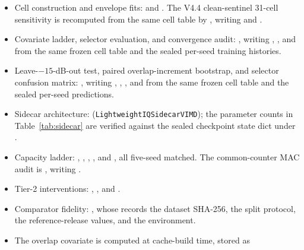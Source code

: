 \documentclass[letterpaper,onecolumn,11pt,journal]{IEEEtran}
\begin{document}
\begin{itemize}\setlength{\itemsep}{2pt}
  \item Cell construction and envelope fits:
   and
  .  The V4.4 clean-sentinel
  31-cell sensitivity is recomputed from the same cell table by
  , writing
   and
  .
  \item Covariate ladder, selector evaluation, and convergence audit:
  , writing
  , , and
   from the same frozen cell table and the
  sealed per-seed  training histories.
  \item Leave-$-15$-dB-out test, paired overlap-increment bootstrap, and
  selector confusion matrix:
  , writing
  , ,
  , and 
  from the same frozen cell table and the sealed per-seed predictions.
  \item Sidecar architecture:
  (\texttt{LightweightIQSidecarVIMD}); the parameter counts in
  Table~\ref{tab:sidecar} are verified against the sealed checkpoint state
  dict under .
  \item Capacity ladder: ,
  ,
  ,
  , and
  , all five-seed matched.
  The common-counter MAC audit is
  , writing
  .
  \item Tier-2 interventions: ,
  , and
  .
  \item Comparator fidelity: , whose
   records the dataset SHA-256, the split protocol, the
  reference-release values, and the environment.
  \item The overlap covariate is computed at cache-build time, stored as

\end{itemize}
\end{document}
